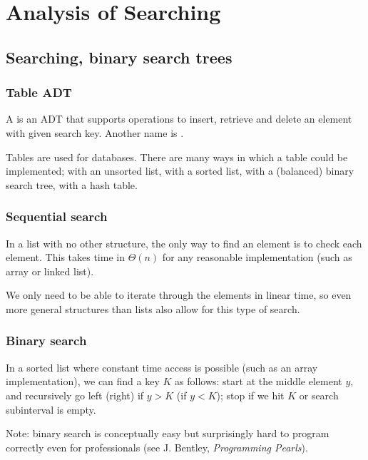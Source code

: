 \part{Analysis of Searching}  
\label{ch:effsearch}

\chapter{Searching, binary search trees} %

\section*{Table ADT}
\begin{Definition}
A  is an ADT that supports operations to insert, retrieve and delete an element
with given search key.  Another name is .
\end{Definition}
Tables are used for databases. There are  many ways in which a table could be implemented;
with an unsorted list, with a sorted list, with a (balanced) binary search tree, with a hash table.

\section*{Sequential search}

In a list with no other structure, the only way to find an element is to 
check each element. 
This takes time in $\Theta(n)$ for any reasonable implementation (such as 
array or linked list).

We only need to be able to iterate through the elements in linear time, so
 even more general structures than lists also allow for this type of search.


\section*{Binary search}

In a sorted list where constant time access is possible 
(such as an array implementation), we can find a key $K$ as follows: start at the middle element $y$, and recursively go left (right) if $y>K$ (if $y<K$);
 stop if we hit  $K$ or search subinterval is empty.

Note: binary search is conceptually easy but surprisingly hard to program
 correctly even for professionals (see J. Bentley, \emph{Programming Pearls}).

